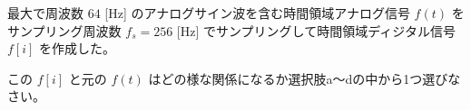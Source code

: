 最大で周波数 $64$ [Hz] のアナログサイン波を含む時間領域アナログ信号 $f(t)$ をサンプリング周波数 $f_s = 256$ [Hz] でサンプリングして時間領域ディジタル信号 $f[i]$ を作成した。\par
この $f[i]$ と元の $f(t)$ はどの様な関係になるか選択肢a〜dの中から1つ選びなさい。
